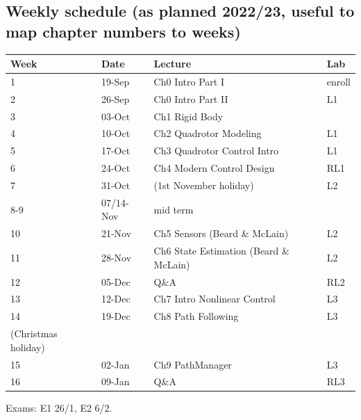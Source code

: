 \documentclass[11pt]{article}
\begin{document}
\subsection{Weekly schedule (as planned 2022/23, useful to map chapter numbers to weeks)}
\begin{center}
\small
\setlength{\tabcolsep}{3pt}
\begin{longtable}{|p{4.45cm}|p{2.11cm}|p{7.11cm}|p{1.53cm}|}
\hline
Week & Date & Lecture & Lab \\
\hline
\endhead
1 & 19-Sep & Ch0 Intro Part I & enroll \\
\hline
2 & 26-Sep & Ch0 Intro Part II & L1 \\
\hline
3 & 03-Oct & Ch1 Rigid Body &  \\
\hline
4 & 10-Oct & Ch2 Quadrotor Modeling & L1 \\
\hline
5 & 17-Oct & Ch3 Quadrotor Control Intro & L1 \\
\hline
6 & 24-Oct & Ch4 Modern Control Design & RL1 \\
\hline
7 & 31-Oct & (1st November holiday) & L2 \\
\hline
8-9 & 07/14-Nov & mid term &  \\
\hline
10 & 21-Nov & Ch5 Sensors (Beard \& McLain) & L2 \\
\hline
11 & 28-Nov & Ch6 State Estimation (Beard \& McLain) & L2 \\
\hline
12 & 05-Dec & Q\&A & RL2 \\
\hline
13 & 12-Dec & Ch7 Intro Nonlinear Control & L3 \\
\hline
14 & 19-Dec & Ch8 Path Following & L3 \\
\hline
(Christmas holiday) &  &  &  \\
\hline
15 & 02-Jan & Ch9 PathManager & L3 \\
\hline
16 & 09-Jan & Q\&A & RL3 \\
\hline
\end{longtable}
\end{center}

Exams: E1 26/1, E2 6/2.
\end{document}

